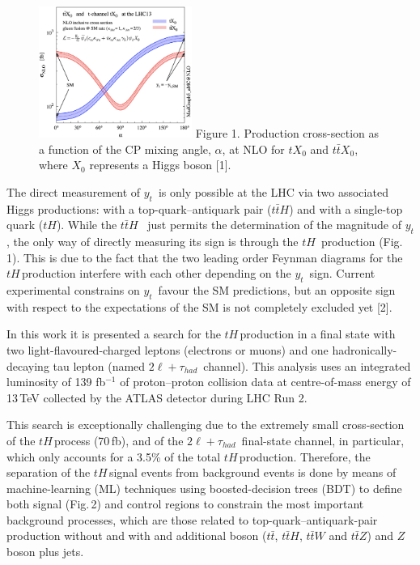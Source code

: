\documentclass[a4paper,10pt]{article}
\newcommand{\yt}{\ensuremath{y_{t}}}
\newcommand{\ttbar}{\ensuremath{t\bar{t}}}
\newcommand{\ttH}{\ensuremath{t\bar{t}H}}
\newcommand{\tH}{\ensuremath{tH}}
\newcommand{\tHq}{\tH}
\newcommand{\dileptau}{\ensuremath{2\ell+\tau_{had}}}
\begin{document}
\begin{figure}
	\includegraphics[width=5cm]{xsec_vs_yt_tH_ttH}
	{\footnotesize Figure 1. Production cross-section as a function of the CP mixing angle,
	$\alpha$, at NLO for $tX_{0}$ and $t\bar{t}X_{0}$, where $X_{0}$ represents a Higgs boson [1].}
\end{figure} 

The direct measurement of \yt$\,$ is only possible at the LHC via two associated
Higgs productions: with a top-quark--antiquark pair (\ttH) and with a single-top quark (\tHq). While the \ttH  
$\,$ just permits the determination of the magnitude of \yt, the only way of directly 
measuring its sign is through the \tHq$\,$ production (Fig.$\,$1). This is due to the fact that the two leading order 
Feynman diagrams for the \tHq$\,$production interfere with each other depending on the \yt$\,$ sign. 
Current experimental constrains on \yt$\,$ favour the SM predictions, but an opposite sign with 
respect to the expectations of the SM is not completely excluded yet [2].

In this work it is presented a search for the \tHq$\,$production in a final state with two light-flavoured-charged 
leptons (electrons or muons) and one hadronically-decaying tau lepton (named \dileptau$\,$ channel).
This analysis uses an integrated luminosity of 139 fb$^{-1}$ of proton--proton collision data at 
centre-of-mass energy of 13$\,$TeV collected by the ATLAS detector during LHC Run 2. 

This search is exceptionally challenging due to the extremely small cross-section of the \tHq$\,$process
(70$\,$fb), and of the \dileptau$\,$ final-state channel, in particular, which only accounts 
for a 3.5\% of the total \tHq$\,$production.
Therefore, the separation of the \tHq$\,$signal events from background events is done by means of 
machine-learning (ML) techniques using boosted-decision trees (BDT) to
define both signal (Fig.$\,$2) and control regions to constrain the most important background processes,
 which are those related
to top-quark--antiquark-pair production without and with and additional boson
(\ttbar, $t\bar{t}H$, $t\bar{t}W$ and $t\bar{t}Z$) and $Z$ boson plus jets.
\end{document}
